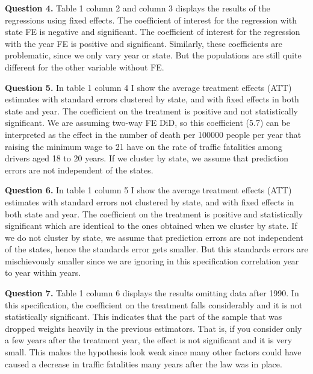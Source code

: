 \documentclass{article}
\theoremstyle{definition}
\begin{document}
   \hspace{0.41cm} \textbf{Question 4.} Table 1 column 2 and column 3 displays the results of the regressions using fixed effects. The coefficient of interest for the regression with state FE is negative and significant. The coefficient of interest for the regression with the year FE is positive and significant. Similarly, these coefficients are problematic, since we only vary year or state. But the populations are still quite different for the other variable without FE. 
  
 
 \hspace{0.41cm} \textbf{Question 5.} In table 1 column 4 I show the average treatment effects (ATT) estimates with standard errors clustered by state, and with fixed effects in both state and year. The coefficient on the treatment is positive and not statistically significant. We are assuming two-way FE DiD, so this coefficient (5.7) can be interpreted as the effect in the number of death per 100000 people per year that raising the minimum wage to 21 have on the rate of traffic fatalities among drivers aged 18 to 20 years. If we cluster by state, we assume that prediction errors are not independent of the states.
 
  \hspace{0.41cm} \textbf{Question 6.}  In table 1 column 5 I show the average treatment effects (ATT) estimates with standard errors not clustered by state, and with fixed effects in both state and year. The coefficient on the treatment is positive and statistically significant which are identical to the ones obtained when we cluster by state.  If we do not cluster by state, we assume that prediction errors are not independent of the states, hence the standards error gets smaller. But this standards errors are mischievously smaller since we are ignoring in this specification correlation year to year within years. 
  
  \hspace{0.41cm} \textbf{Question 7.} Table 1 column 6 displays the results omitting data after 1990. In this specification, the coefficient on the treatment falls considerably and it is not statistically significant. This indicates that the part of the sample that was dropped weights heavily in the previous estimators. That is, if you consider only a few years after the treatment year, the effect is not significant and it is very small. This makes the hypothesis look weak since many other factors could have caused a decrease in traffic fatalities many years after the law was in place. 
 
\end{document}
